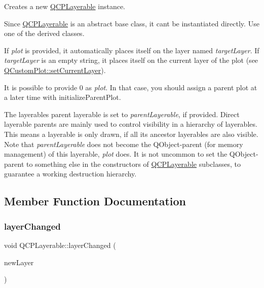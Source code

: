 Creates a new \hyperlink{class_q_c_p_layerable}{Q\+C\+P\+Layerable} instance.

Since \hyperlink{class_q_c_p_layerable}{Q\+C\+P\+Layerable} is an abstract base class, it can\textquotesingle{}t be instantiated directly. Use one of the derived classes.

If {\itshape plot} is provided, it automatically places itself on the layer named {\itshape target\+Layer}. If {\itshape target\+Layer} is an empty string, it places itself on the current layer of the plot (see \hyperlink{class_q_custom_plot_a73a6dc47c653bb6f8f030abca5a11852}{Q\+Custom\+Plot\+::set\+Current\+Layer}).

It is possible to provide 0 as {\itshape plot}. In that case, you should assign a parent plot at a later time with initialize\+Parent\+Plot.

The layerable\textquotesingle{}s parent layerable is set to {\itshape parent\+Layerable}, if provided. Direct layerable parents are mainly used to control visibility in a hierarchy of layerables. This means a layerable is only drawn, if all its ancestor layerables are also visible. Note that {\itshape parent\+Layerable} does not become the Q\+Object-\/parent (for memory management) of this layerable, {\itshape plot} does. It is not uncommon to set the Q\+Object-\/parent to something else in the constructors of \hyperlink{class_q_c_p_layerable}{Q\+C\+P\+Layerable} subclasses, to guarantee a working destruction hierarchy. 

\subsection{Member Function Documentation}
\hypertarget{class_q_c_p_layerable_abbf8657cedea73ac1c3499b521c90eba}{}\label{class_q_c_p_layerable_abbf8657cedea73ac1c3499b521c90eba} 
\subsubsection{\texorpdfstring{layer\+Changed}{layerChanged}}
{\footnotesize\ttfamily void Q\+C\+P\+Layerable\+::layer\+Changed (\begin{DoxyParamCaption}\item[{\hyperlink{class_q_c_p_layer}{Q\+C\+P\+Layer} $\ast$}]{new\+Layer }\end{DoxyParamCaption})\hspace{0.3cm}{\ttfamily [signal]}}

